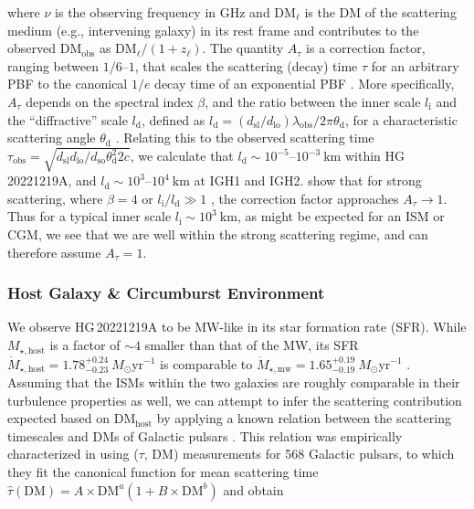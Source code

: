 \documentclass[twocolumn, linenumbers, tra]{aastex631}
\begin{document}
\noindent
where $\nu$ is the observing frequency in GHz and $\mathrm{DM}_{\ell}$ is the DM of the {scattering medium (e.g., intervening galaxy)} in its rest frame and contributes to the observed $\mathrm{DM}_{\mathrm{obs}}$ as $\mathrm{DM}_{\ell} /\left(1+z_{\ell}\right)$. {The quantity $A_\tau$ is a correction factor, ranging between $1/6$--$1$, that scales the scattering (decay) time $\tau$ for an arbitrary PBF to the canonical $1/e$ decay time of an exponential PBF \citep{Ocker2021, Cordes2022, Geiger2024}. More specifically, $A_\tau$ depends on the spectral index $\beta$, and the ratio between the inner scale $l_{\mathrm{i}}$ and the ``diffractive'' scale $l_{\mathrm{d}}$, defined as $l_{\mathrm{d}} = (d_{\mathrm{sl}}/d_{\mathrm{lo}})\lambda_{\mathrm{obs}}/2\pi \theta_{\mathrm{d}}$, for a characteristic scattering angle $\theta_{\mathrm{d}}$ \citep{Rickett1990}. Relating this to the observed scattering time $\tau_{\mathrm{obs}} = \sqrt{d_{\mathrm{sl}} d_{\mathrm{lo}}/ d_{\mathrm{so}}\theta_{\mathrm{d}}^2{2 c}}$, we calculate that $l_{\mathrm{d}} \sim 10^{-5}$--$10^{-3}\ \mathrm{km}$ within HG\,20221219A, and $l_{\mathrm{d}} \sim 10^{3}$--$10^{4}\ \mathrm{km}$ at IGH1 and IGH2. \citet{Cordes2022} show that for strong scattering, where $\beta = 4$ or $l_{\mathrm{i}}/l_{\mathrm{d}} \gg 1$ \citep[consistent with a square-law structure function and our pulse model in Eq.~\ref{eq:expgauss};][]{Rickett1990}, the correction factor approaches $A_\tau \rightarrow 1$. Thus for a typical inner scale $l_{\mathrm{i}} \sim 10^3\ \mathrm{km}$, as might be expected for an ISM or CGM, we see that we are well within the strong scattering regime, and can therefore assume $A_\tau=1$.}

\subsubsection{Host Galaxy \& Circumburst Environment}\label{sec:hostscat}

We observe HG\,20221219A to be MW-like in its star formation rate (SFR). While $M_{\star, \mathrm{host}}$ is a factor of $ \sim 4$ smaller than that of the MW, its SFR $\dot{M}_{\star, \mathrm{host}} = 1.78_{-0.23}^{+0.24} \ M_\odot \mathrm{yr}^{-1}$ is comparable to $\dot{M}_{\star, \mathrm{mw}} = 1.65^{+0.19}_{-0.19} \ M_\odot \mathrm{yr}^{-1}$ \citep{Licquia2015}. Assuming that the ISMs within the two galaxies are roughly comparable in their turbulence properties as well, we can attempt to infer the scattering contribution expected based on DM$_{\mathrm{host}}$ by applying a known relation between the scattering timescales and DMs of Galactic pulsars \citep[henceforth referred to as the $\tau$--$\mathrm{DM}$ relation;][]{Sutton1971, Rickett1977, Cordes1991, Bhat2004}. This relation was empirically characterized in \citet{Cordes2016} using ($\tau$, $\mathrm{DM}$) measurements for 568 Galactic pulsars, to which they fit the canonical function for mean scattering time $\widehat{\tau}(\mathrm{DM})=A \times \mathrm{DM}^a\left(1+B \times \mathrm{DM}^b\right)$ \citep{Ramachandran1997} and obtain
\end{document}
